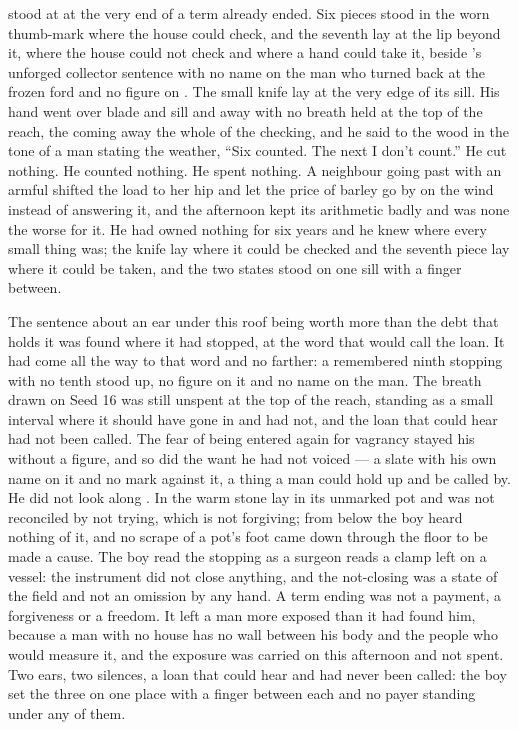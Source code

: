  stood at  at the very end of a term already ended. Six pieces stood in the worn thumb-mark where the house could check, and the seventh lay at the lip beyond it, where the house could not check and where a hand could take it, beside 's unforged collector sentence with no name on the man who turned back at the frozen ford and no figure on . The small knife lay at the very edge of its sill. His hand went over blade and sill and away with no breath held at the top of the reach, the coming away the whole of the checking, and he said to the wood in the tone of a man stating the weather, “Six counted. The next I don't count.” He cut nothing. He counted nothing. He spent nothing. A neighbour going past with an armful shifted the load to her hip and let the price of barley go by on the wind instead of answering it, and the afternoon kept its arithmetic badly and was none the worse for it. He had owned nothing for six years and he knew where every small thing was; the knife lay where it could be checked and the seventh piece lay where it could be taken, and the two states stood on one sill with a finger between.

The sentence about an ear under this roof being worth more than the debt that holds it was found where it had stopped, at the word that would call the loan. It had come all the way to that word and no farther: a remembered ninth stopping with no tenth stood up, no figure on it and no name on the man. The breath drawn on Seed 16 was still unspent at the top of the reach, standing as a small interval where it should have gone in and had not, and the loan that could hear had not been called. The fear of being entered again for vagrancy stayed his without a figure, and so did the want he had not voiced --- a slate with his own name on it and no mark against it, a thing a man could hold up and be called by. He did not look along . In  the warm stone lay in its unmarked pot and was not reconciled by not trying, which is not forgiving; from below the boy heard nothing of it, and no scrape of a pot's foot came down through the floor to be made a cause. The boy read the stopping as a surgeon reads a clamp left on a vessel: the instrument did not close anything, and the not-closing was a state of the field and not an omission by any hand. A term ending was not a payment, a forgiveness or a freedom. It left a man more exposed than it had found him, because a man with no house has no wall between his body and the people who would measure it, and the exposure was carried on this afternoon and not spent. Two ears, two silences, a loan that could hear and had never been called: the boy set the three on one place with a finger between each and no payer standing under any of them.


